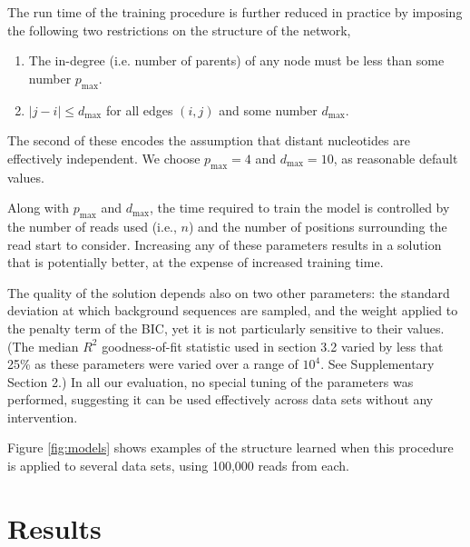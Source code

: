 \documentclass{bioinfo}
\begin{document}
The run time of the training procedure is further reduced in practice by
imposing the following two restrictions on the structure of the network,
\begin{enumerate}
\item The in-degree (i.e. number of parents) of any node must be less than some
number $p_{\text{max}}$.
\item $|j - i| \le d_{\text{max}}$ for all edges $(i,j)$ and some number $d_{\text{max}}$.
\end{enumerate}
The second of these encodes the assumption that distant nucleotides are
effectively independent. We choose $p_{\text{max}} = 4$ and $d_{\text{max}} =
10$, as reasonable default values.

Along with $p_{\text{max}}$ and $d_{\text{max}}$, the time required to train the
model is controlled by the number of reads used (i.e., $n$) and the number of
positions surrounding the read start to consider. Increasing any of these
parameters results in a  solution that is potentially better, at
the expense of increased training time.

The quality of the solution depends also on two other parameters: the standard
deviation at which background sequences are sampled, and the weight applied to
the penalty term of the BIC, yet it is not particularly sensitive to their
values. (The median $R^2$ goodness-of-fit statistic used in section 3.2 varied
by less that 25\% as these parameters were varied over a range of $10^4$. See
Supplementary Section 2.) In all our evaluation, no special tuning of the
parameters was performed, suggesting it can be used effectively across data sets
without any intervention.

Figure \ref{fig:models} shows examples of the structure learned when this
procedure is applied to several data sets, using 100,000 reads from each.


\section{Results}
\end{document}
